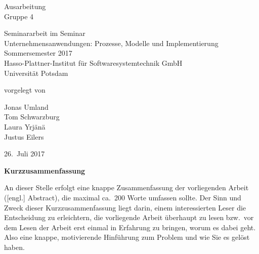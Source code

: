 \documentclass[11pt, a4paper]{article}
\begin{document}
          

\begin{titlepage}
  \begin{center} 
    \mbox{}
    \vspace{1cm}
    
    {\huge Ausarbeitung \\[1em] {\LARGE Gruppe 4}}  
        
    \vspace{5cm}
    
    Seminararbeit im Seminar \\[1em]
    {\large \sc Unternehmensanwendungen: Prozesse, Modelle und Implementierung} \\[1em]
    Sommersemester 2017 \\[1em]
    Hasso-Plattner-Institut für Softwaresystemtechnik GmbH \\[1em]
    Universität Potsdam
    
    \vspace{3cm}
    
		vorgelegt von
		
    \vspace{1em}
    
		{\Large Jonas Umland} \\
		{\Large Tom Schwarzburg}\\
		{\Large Laura Yrjänä}\\
		{\Large Justus Eilers}
		
    \vspace{3em}
    
    26.~Juli 2017
  \end{center}
\end{titlepage}


\setcounter{page}{1}

\begin{center}
{\bf Kurzzusammenfassung} 
\end{center}

\noindent
An dieser Stelle erfolgt eine knappe Zusammenfassung der vorliegenden Arbeit ([engl.] Abstract), die maximal ca.~200 Worte umfassen sollte. 
Der Sinn und Zweck dieser Kurzzusammenfassung liegt darin, einem interessierten Leser die Entscheidung zu erleichtern, die vorliegende Arbeit überhaupt zu lesen bzw.~vor dem Lesen der Arbeit erst einmal in Erfahrung zu bringen, worum es dabei geht.
Also eine knappe, motivierende Hinführung zum Problem und wie Sie es gelöst haben.
\end{document}

